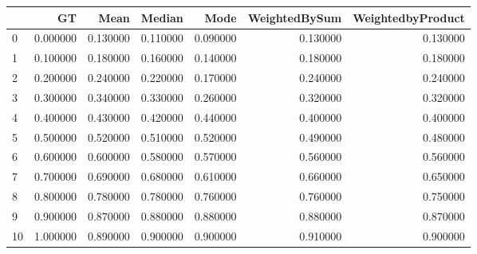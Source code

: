 \begin{tabular}{lrrrrrr}
\toprule
 & GT & Mean & Median & Mode & WeightedBySum & WeightedbyProduct \\
\midrule
0 & 0.000000 & 0.130000 & 0.110000 & 0.090000 & 0.130000 & 0.130000 \\
1 & 0.100000 & 0.180000 & 0.160000 & 0.140000 & 0.180000 & 0.180000 \\
2 & 0.200000 & 0.240000 & 0.220000 & 0.170000 & 0.240000 & 0.240000 \\
3 & 0.300000 & 0.340000 & 0.330000 & 0.260000 & 0.320000 & 0.320000 \\
4 & 0.400000 & 0.430000 & 0.420000 & 0.440000 & 0.400000 & 0.400000 \\
5 & 0.500000 & 0.520000 & 0.510000 & 0.520000 & 0.490000 & 0.480000 \\
6 & 0.600000 & 0.600000 & 0.580000 & 0.570000 & 0.560000 & 0.560000 \\
7 & 0.700000 & 0.690000 & 0.680000 & 0.610000 & 0.660000 & 0.650000 \\
8 & 0.800000 & 0.780000 & 0.780000 & 0.760000 & 0.760000 & 0.750000 \\
9 & 0.900000 & 0.870000 & 0.880000 & 0.880000 & 0.880000 & 0.870000 \\
10 & 1.000000 & 0.890000 & 0.900000 & 0.900000 & 0.910000 & 0.900000 \\
\bottomrule
\end{tabular}
